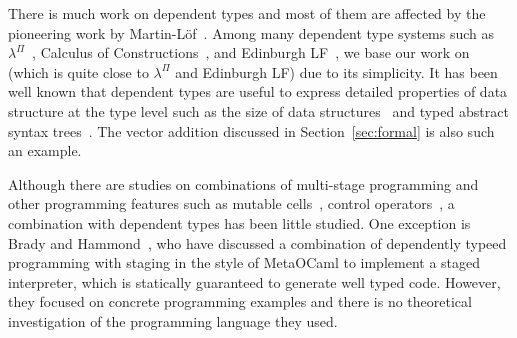 





There is much work on dependent types and most of them are affected by
the pioneering work by Martin-L\"{o}f~\cite{martin1973intuitionstic}.
Among many dependent type systems such as
$\lambda^\Pi$~\cite{Meyer1986}, Calculus of
Constructions~\cite{coquand:inria-00076024}, and Edinburgh
LF~\cite{harper1993framework}, we base our work on \LLF~\cite{attapl}
(which is quite close to $\lambda^\Pi$ and Edinburgh LF) due to its
simplicity.  It has been well known that dependent types are useful to
express detailed properties of data structure at the type level such
as the size of data structures~\cite{Xi98} and typed abstract syntax
trees~\cite{DBLP:conf/dsl/LeijenM99,DBLP:conf/popl/XiCC03}.  The
vector addition discussed in Section~\ref{sec:formal} is also such an
example.




Although there are studies on combinations of multi-stage programming and other programming features such as mutable cells~\cite{kiselyov2016refined},
control operators~\cite{KameyamaKiselyovShan09PEPM,oishi2017staging},
a combination with dependent types has been little studied.
One exception is Brady and Hammond~\cite{brady2006dependently},
who have discussed a
combination of dependently typeed programming with staging in the
style of MetaOCaml to implement a staged interpreter, which is
statically guaranteed to generate well typed code.  However, they
focused on concrete programming examples and there is no theoretical investigation
of the programming language they used.


